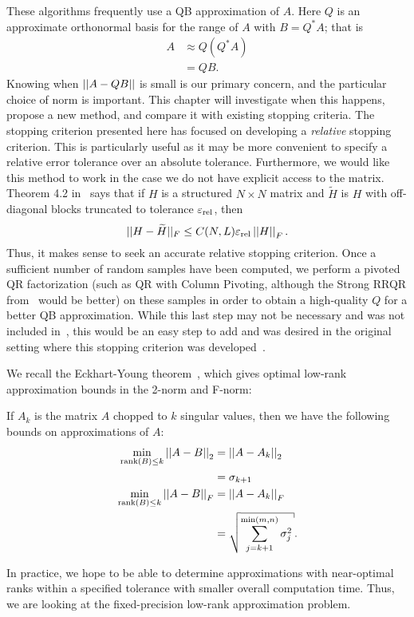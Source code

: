 

These algorithms frequently use a QB approximation of $A$.
Here $Q$ is an approximate orthonormal basis for the range of $A$
with $B = Q^{*}A$; that is
%
\begin{align}
    A &\approx Q(Q^{*}A) \nonumber\\
    &= QB.
\end{align}
%
Knowing when $\left| \left| A - QB \right| \right|$ is small is our primary concern,
and the particular choice of norm is important.
This chapter will investigate when this happens,
propose a new method, and compare it with existing stopping criteria.
The stopping criterion presented here has focused on developing
a \emph{relative} stopping criterion.
This is particularly useful as it may be more convenient
to specify a relative error tolerance over an absolute tolerance.
Furthermore, we would like this method to work in the case
we do not have explicit access to the matrix.
Theorem 4.2 in~\cite{vogel2016superfast} says that if $H$ is a
structured $N\times N$ matrix and $\widetilde{H}$ is $H$
with off-diagonal blocks truncated
to tolerance $\varepsilon_{\text{rel}}$, then
%
\begin{equation}
    ||H - \widetilde{H}||_{F} \le C(N,L)\varepsilon_{\text{rel}}\left| \left| H \right| \right|_{F}.
\end{equation}
%
Thus, it makes sense to seek an accurate relative stopping criterion.
Once a sufficient number of random samples have been computed,
we perform a pivoted QR factorization
(such as QR with Column Pivoting, although the Strong RRQR
from~\cite{gu1996efficient} would be better) on these samples
in order to obtain a high-quality $Q$ for a better QB approximation.
While this last step may not be necessary and was not included
in~\cite{yu2018efficient,martinsson2016randomized},
this would be an easy step to add and was desired in
the original setting where this stopping criterion was
developed~\cite{randomHSSLBL}.



We recall the Eckhart-Young theorem~\cite[Theorem~1.1]{gu2015subspace},
which gives optimal low-rank approximation bounds in the 2-norm and F-norm:

\begin{thm}
If $A_{k}$ is the matrix $A$ chopped to $k$ singular values,
then we have the following bounds on approximations of $A$:
%
\begin{align}
    \min_{\text{rank}(B)\le k}\norm{A-B}_{2} &= \norm{A-A_{k}}_{2} \nonumber\\
        &= \sigma_{k+1} \nonumber\\
    \min_{\text{rank}(B)\le k}\norm{A-B}_{F} &= \norm{A-A_{k}}_{F} \nonumber\\
        &= \sqrt{\sum_{j=k+1}^{\min(m,n)}\sigma_{j}^{2}}.
\end{align}
\end{thm}

\noindent
In practice, we hope to be able to determine approximations
with near-optimal ranks within a specified tolerance
with smaller overall computation time.
Thus, we are looking at the fixed-precision low-rank approximation problem.


